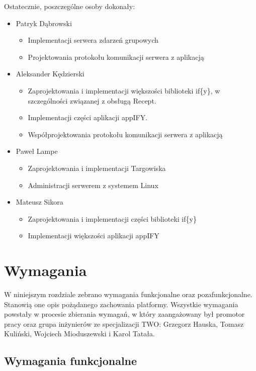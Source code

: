 \documentclass[11pt,a4paper,polish,thesis]{dcsbook}
\begin{document}
Ostatecznie, poszczególne osoby dokonały:
\begin{itemize}
\item Patryk Dąbrowski
\begin{itemize}
\item Implementacji serwera zdarzeń grupowych
\item Projektowania protokołu komunikacji serwera z aplikacją
\end{itemize}
\item Aleksander Kędzierski
\begin{itemize}
\item Zaprojektowania i implementacji większości biblioteki if\{y\}, w szczególności związanej z obsługą Recept.
\item Implementacji części aplikacji appIFY.
\item Współprojektowania protokołu komunikacji serwera z aplikacją
\end{itemize}
\item Paweł Lampe
\begin{itemize}
\item Zaprojektowania i implementacji Targowiska
\item Administracji serwerem z systemem Linux
\end{itemize}
\item Mateusz Sikora
\begin{itemize}
\item Zaprojektowania i implementacji części biblioteki if\{y\}
\item Implementacji większości aplikacji appIFY
\end{itemize}
\end{itemize}
\chapter{Wymagania}
W niniejszym rozdziale zebrano wymagania funkcjonalne oraz pozafunkcjonalne. Stanowią one opis pożądanego zachowania platformy. Wszystkie wymagania powstały
w procesie zbierania wymagań, w który zaangażowany był promotor pracy oraz grupa inżynierów ze specjalizacji TWO: Grzegorz Hauska, Tomasz Kuliński, Wojciech
Mioduszewski i Karol Tatała.
\section{Wymagania funkcjonalne}
\end{document}

